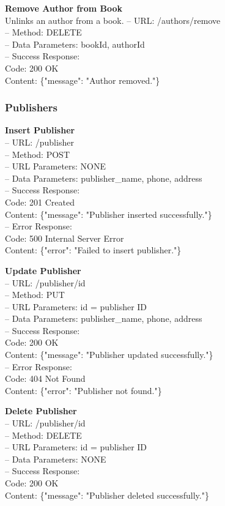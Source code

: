 \textbf{Remove Author from Book} \\
Unlinks an author from a book.
– URL: /authors/remove \\
– Method: DELETE \\
– Data Parameters: bookId, authorId \\
– Success Response: \\
Code: 200 OK \\
Content: \{"message": "Author removed."\}

\subsubsection*{Publishers}

\textbf{Insert Publisher} \\
– URL: /publisher \\
– Method: POST \\
– URL Parameters: NONE \\
– Data Parameters: publisher\_name, phone, address \\
– Success Response: \\
Code: 201 Created \\
Content: \{"message": "Publisher inserted successfully."\} \\
– Error Response: \\
Code: 500 Internal Server Error \\
Content: \{"error": "Failed to insert publisher."\}

\textbf{Update Publisher} \\
– URL: /publisher/{id} \\
– Method: PUT \\
– URL Parameters: id = publisher ID \\
– Data Parameters: publisher\_name, phone, address \\
– Success Response: \\
Code: 200 OK \\
Content: \{"message": "Publisher updated successfully."\} \\
– Error Response: \\
Code: 404 Not Found \\
Content: \{"error": "Publisher not found."\}

\textbf{Delete Publisher} \\
– URL: /publisher/{id} \\
– Method: DELETE \\
– URL Parameters: id = publisher ID \\
– Data Parameters: NONE \\
– Success Response: \\
Code: 200 OK \\
Content: \{"message": "Publisher deleted successfully."\}


